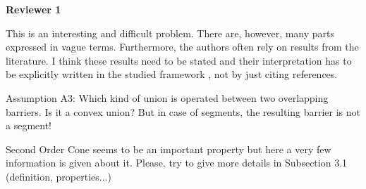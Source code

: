 \documentclass{article}
\newenvironment{reviewer}{\setcounter{pointcounter}{1}}{}
\newcommand{\point}{\text{{\selectfont \thepointcounter} \stepcounter{pointcounter}}}
\begin{document}
	\begin{reviewer}
		
		\begin{tcolorbox}[breakable,enhanced,coltitle=black,colback=red!75!black,colframe=red!75!black,borderline={1pt}{0pt}{black},boxrule=0pt]
			\textbf{Reviewer 1}
		\end{tcolorbox}
		
		\begin{itshape}
			This is an interesting and difficult problem. There are, however, many parts
			expressed in vague terms. Furthermore, the authors often rely on results from the
			literature. I think these results need to be stated and their interpretation has to be
			explicitly written in the studied framework , not by just citing references.
		\end{itshape}
		
		\begin{tcolorbox}[breakable,enhanced,coltitle=black,colback=red!5!white,colframe=red!75!black,title=\textbf{Answer R1.\point},borderline={1pt}{0pt}{black},boxrule=0pt]

		\end{tcolorbox}
		
		\begin{itshape}
			Assumption A3: Which kind of union is operated between two overlapping barriers. Is it a convex union? But in case of segments, the resulting barrier is not a segment!
		\end{itshape}
		
		\begin{tcolorbox}[breakable,enhanced,coltitle=black,colback=red!5!white,colframe=red!75!black,title=\textbf{Answer R1.\point},borderline={1pt}{0pt}{black},boxrule=0pt]

		\end{tcolorbox}
		
		\begin{itshape}
			Second Order Cone seems to be an important property but here a very few information is given about it. Please, try to give more details in Subsection 3.1 (definition, properties...)
		\end{itshape}
		
		\begin{tcolorbox}[breakable,enhanced,coltitle=black,colback=red!5!white,colframe=red!75!black,title=\textbf{Answer R1.\point},borderline={1pt}{0pt}{black},boxrule=0pt]

		\end{tcolorbox}
		

\end{reviewer}
\end{document}
